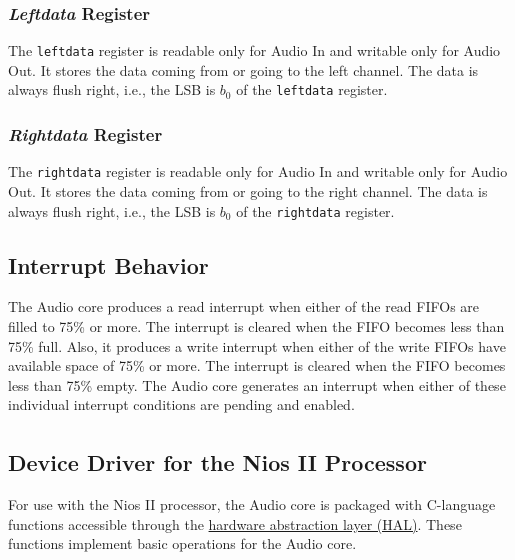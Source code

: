 \documentclass[11pt, twoside, pdftex]{article}
\begin{document}
\subsubsection{\textit{Leftdata} Register}
The \texttt{leftdata} register is readable only for Audio In and writable only
for Audio Out.  It stores the data coming from or going to the left channel.
The data is always flush right, i.e., the LSB is $b_0$ of the \texttt{leftdata}
register.

\subsubsection{\textit{Rightdata} Register}
The \texttt{rightdata} register is readable only for Audio In and writable only
for Audio Out. It stores the data coming from or going to the right channel.
The data is always flush right, i.e., the LSB is $b_0$ of the
\texttt{rightdata} register.

\subsection{Interrupt Behavior}
The Audio core produces a read interrupt when either of the read FIFOs are 
filled to 75\% or more. The interrupt is cleared when the FIFO becomes less than 
75\% full. Also, it produces a write interrupt when either of the write FIFOs 
have available space of 75\% or more. The interrupt is cleared when the FIFO 
becomes less than 75\% empty. The Audio core generates an interrupt when 
either of these individual interrupt conditions are pending and enabled.



\subsection{Device Driver for the Nios\textsuperscript{\textregistered} II Processor}
For use with the Nios II processor, the Audio core is packaged with C-language 
functions accessible through the
\href{http://www.altera.com/literature/hb/nios2/n2sw_nii5v2_02.pdf}{hardware
abstraction layer (HAL)}. These functions implement basic operations
for the Audio core. 
\end{document}

